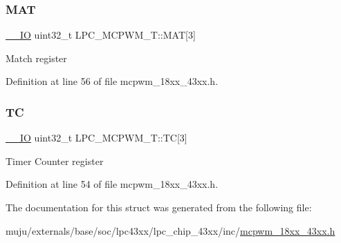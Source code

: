 \mbox{\label{struct_l_p_c___m_c_p_w_m___t_ac3b16a52a48e436af60d17ce27c5c879}} 
\subsubsection{\texorpdfstring{M\+AT}{MAT}}
{\footnotesize\ttfamily \hyperlink{core__sc300_8h_aec43007d9998a0a0e01faede4133d6be}{\+\_\+\+\_\+\+IO} uint32\+\_\+t L\+P\+C\+\_\+\+M\+C\+P\+W\+M\+\_\+\+T\+::\+M\+AT\mbox{[}3\mbox{]}}

Match register 

Definition at line 56 of file mcpwm\+\_\+18xx\+\_\+43xx.\+h.

\mbox{\label{struct_l_p_c___m_c_p_w_m___t_ae6960477ec37aa32fbb20956cf01edb7}} 
\subsubsection{\texorpdfstring{TC}{TC}}
{\footnotesize\ttfamily \hyperlink{core__sc300_8h_aec43007d9998a0a0e01faede4133d6be}{\+\_\+\+\_\+\+IO} uint32\+\_\+t L\+P\+C\+\_\+\+M\+C\+P\+W\+M\+\_\+\+T\+::\+TC\mbox{[}3\mbox{]}}

Timer Counter register 

Definition at line 54 of file mcpwm\+\_\+18xx\+\_\+43xx.\+h.



The documentation for this struct was generated from the following file\+:\begin{DoxyCompactItemize}
\item 
muju/externals/base/soc/lpc43xx/lpc\+\_\+chip\+\_\+43xx/inc/\hyperlink{mcpwm__18xx__43xx_8h}{mcpwm\+\_\+18xx\+\_\+43xx.\+h}\end{DoxyCompactItemize}
